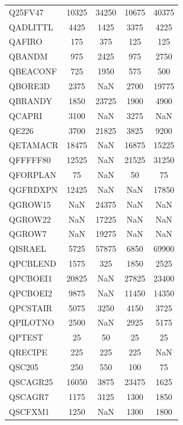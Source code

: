 \begin{longtable}{lcccc}
Q25FV47  &    10325 & 34250 &    10675 &    40375 \\
QADLITTL &     4425 &  1425 &     3375 &     4225 \\
QAFIRO   &      175 &   375 &      125 &      125 \\
QBANDM   &      975 &  2425 &      975 &     2750 \\
QBEACONF &      725 &  1950 &      575 &      500 \\
QBORE3D  &     2375 &   NaN &     2700 &    19775 \\
QBRANDY  &     1850 & 23725 &     1900 &     4900 \\
QCAPRI   &     3100 &   NaN &     3275 &      NaN \\
QE226    &     3700 & 21825 &     3825 &     9200 \\
QETAMACR &    18475 &   NaN &    16875 &    15225 \\
QFFFFF80 &    12525 &   NaN &    21525 &    31250 \\
QFORPLAN &       75 &   NaN &       50 &       75 \\
QGFRDXPN &    12425 &   NaN &      NaN &    17850 \\
QGROW15  &      NaN & 24375 &      NaN &      NaN \\
QGROW22  &      NaN & 17225 &      NaN &      NaN \\
QGROW7   &      NaN & 19275 &      NaN &      NaN \\
QISRAEL  &     5725 & 57875 &     6850 &    69900 \\
QPCBLEND &     1575 &   325 &     1850 &     2525 \\
QPCBOEI1 &    20825 &   NaN &    27825 &    23400 \\
QPCBOEI2 &     9875 &   NaN &    11450 &    14350 \\
QPCSTAIR &     5075 &  3250 &     4150 &     3725 \\
QPILOTNO &     2500 &   NaN &     2925 &     5175 \\
QPTEST   &       25 &    50 &       25 &       25 \\
QRECIPE  &      225 &   225 &      225 &      NaN \\
QSC205   &      250 &   550 &      100 &       75 \\
QSCAGR25 &    16050 &  3875 &    23475 &     1625 \\
QSCAGR7  &     1175 &  3125 &     1300 &     1850 \\
QSCFXM1  &     1250 &   NaN &     1300 &     1800 \\

\end{longtable}
